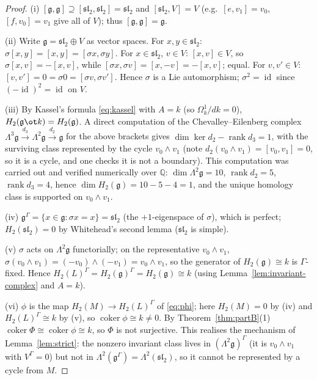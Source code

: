 \documentclass{amsart}
\theoremstyle{definition}
\DeclareMathOperator{\id}{id}
\newcommand{\g}{\mathfrak{g}}
\newcommand{\sw}{\mathfrak{sl}}
\newcommand{\Om}{\Omega}
\newcommand{\Gm}{\Gamma}
\newcommand{\ra}{\rightarrow}
\begin{document}
\begin{proof}
(i) $[\g,\g]\supseteq[\sw_2,\sw_2]=\sw_2$ and $[\sw_2,V]=V$ (e.g.\ $[e,v_1]=v_0$,
$[f,v_0]=v_1$ give all of $V$); thus $[\g,\g]=\g$.

(ii) Write $\g=\sw_2\oplus V$ as vector spaces.  For $x,y\in\sw_2$:
$\sigma[x,y]=[x,y]=[\sigma x,\sigma y]$.  For $x\in\sw_2$, $v\in V$:
$[x,v]\in V$, so $\sigma[x,v]=-[x,v]$, while $[\sigma x,\sigma v]=[x,-v]=-[x,v]$;
equal.  For $v,v'\in V$: $[v,v']=0=\sigma 0=[\sigma v,\sigma v']$.  Hence $\sigma$
is a Lie automorphism; $\sigma^2=\id$ since $(-\id)^2=\id$ on $V$.

(iii) By Kassel's formula \eqref{eq:kassel} with $A=k$ (so $\Om^1_k/dk=0$),
$H_2(\g\ot k)=H_2(\g)$.  A direct computation of the Chevalley--Eilenberg complex
$\Lambda^3\g\xrightarrow{d_3}\Lambda^2\g\xrightarrow{d_2}\g$ for the above brackets
gives $\dim\ker d_2-\operatorname{rank}d_3=1$, with the surviving class represented
by the cycle $v_0\wedge v_1$ (note $d_2(v_0\wedge v_1)=[v_0,v_1]=0$, so it is a
cycle, and one checks it is not a boundary).  This computation was carried out and
verified numerically over $\mathbb Q$: $\dim\Lambda^2\g=10$,
$\operatorname{rank}d_2=5$, $\operatorname{rank}d_3=4$, hence
$\dim H_2(\g)=10-5-4=1$, and the unique homology class is supported on
$v_0\wedge v_1$.

(iv) $\g^{\Gm}=\{x\in\g:\sigma x=x\}=\sw_2$ (the $+1$-eigenspace of $\sigma$),
which is perfect; $H_2(\sw_2)=0$ by Whitehead's second lemma ($\sw_2$ is simple).

(v) $\sigma$ acts on $\Lambda^2\g$ functorially; on the representative
$v_0\wedge v_1$, $\sigma(v_0\wedge v_1)=(-v_0)\wedge(-v_1)=v_0\wedge v_1$, so the
generator of $H_2(\g)\cong k$ is $\Gm$-fixed.  Hence $H_2(L)^{\Gm}=H_2(\g)^{\Gm}=
H_2(\g)\cong k$ (using Lemma~\ref{lem:invariant-complex} and $A=k$).

(vi) $\phi$ is the map $H_2(M)\ra H_2(L)^{\Gm}$ of \eqref{eq:phi}; here
$H_2(M)=0$ by (iv) and $H_2(L)^{\Gm}\cong k$ by (v), so $\operatorname{coker}\phi
\cong k\ne0$.  By Theorem~\ref{thm:partB}(1) $\operatorname{coker}\Phi\cong
\operatorname{coker}\phi\cong k$, so $\Phi$ is not surjective.  This realises the
mechanism of Lemma~\ref{lem:strict}: the nonzero invariant class lives in
$(\Lambda^2\g)^{\Gm}$ (it is $v_0\wedge v_1$ with $V^{\Gm}=0$) but not in
$\Lambda^2(\g^{\Gm})=\Lambda^2(\sw_2)$, so it cannot be represented by a cycle from
$M$.
\end{proof}
\end{document}
